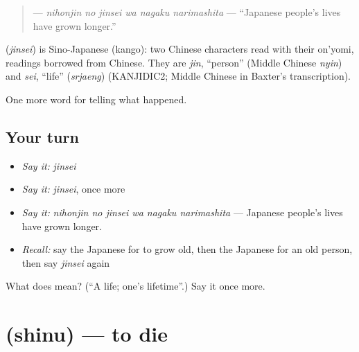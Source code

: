 \begin{quote}
\textbf{   } — \emph{nihonjin no jinsei wa nagaku narimashita} — \textquotedblleft{}Japanese people's lives have grown longer.\textquotedblright{}
\end{quote}

\begin{cousinweb}
\textbf{} (\emph{jinsei}) is Sino-Japanese (kango): two Chinese characters read with their on'yomi, readings borrowed from Chinese. They are \emph{jin}, \textquotedblleft{}person\textquotedblright{} (Middle Chinese \emph{nyin}) and \emph{sei}, \textquotedblleft{}life\textquotedblright{} (\emph{srjaeng}) (KANJIDIC2; Middle Chinese in Baxter's transcription).
\end{cousinweb}

\begin{grammarlens}[title={What you've built}]
One more word for telling what happened.
\end{grammarlens}

\subsection*{Your turn}
\begin{itemize}
\raggedright
  \item \emph{Say it:} \emph{jinsei}
  \item \emph{Say it:} \emph{jinsei}, once more
  \item \emph{Say it:} \emph{nihonjin no jinsei wa nagaku narimashita} — Japanese people's lives have grown longer.
  \item \emph{Recall:} say the Japanese for to grow old, then the Japanese for an old person, then say \emph{jinsei} again
\end{itemize}

\begin{tcolorbox}[breakable,colback=teal!4,colframe=teal!35!black,title={Before you move on}]
What does  mean? (\textquotedblleft{}A life; one's lifetime\textquotedblright{}.) Say it once more.
\end{tcolorbox}
\section[\texorpdfstring{\ja{しぬ} (shinu)}{しぬ (shinu)}]{ (shinu) — to die}

\label{lesson:JA-C292-shinu}



